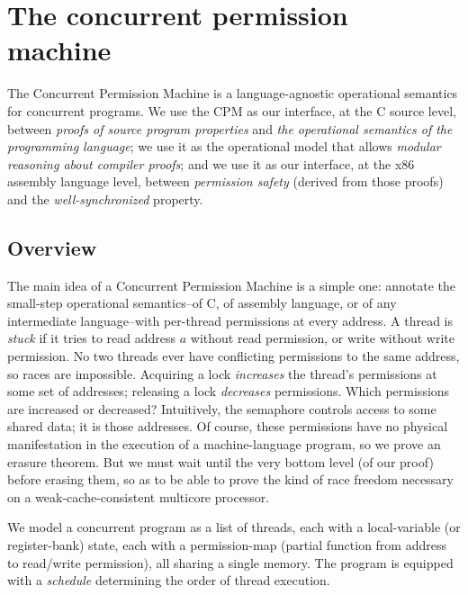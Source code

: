 \section{The concurrent permission machine}
\label{sec:topbottom:cpm}

The Concurrent Permission Machine is a language-agnostic operational semantics for concurrent programs.
We use the CPM as our interface, at the C source level, between
\emph{proofs of source program properties} and
\emph{the operational semantics of the programming language};
we use it as the operational model that allows \emph{modular reasoning about compiler proofs}; and
we use it as our interface, at the x86 assembly language level,
between \emph{permission safety} (derived from those proofs)
and the \emph{well-synchronized} property.

\subsection{Overview}
The main idea of a Concurrent Permission Machine is a simple one: annotate the small-step operational semantics--of C, of assembly language, or of any intermediate language--with per-thread permissions at every address. A thread is \emph{stuck} if it tries to read address $a$ without read permission, or write without write permission. No two threads ever have conflicting permissions to the same address, so races are impossible. Acquiring a lock \emph{increases} the thread's permissions at some set of addresses; releasing a lock \emph{decreases} permissions. Which permissions are increased or decreased? Intuitively, the semaphore controls access to some shared data; it is those addresses. Of course, these permissions have no physical manifestation in the execution of a machine-language program, so we prove an erasure theorem. But we must wait until the very bottom level (of our proof) before erasing them, so as to be able to prove the kind of race freedom necessary on a weak-cache-consistent multicore processor.

We model a concurrent program as a list of threads,
each with a local-variable (or register-bank) state,
each with a permission-map (partial function from address
to read/write permission), all sharing a single memory.
The program is equipped with a \emph{schedule}
determining the order of thread execution.

